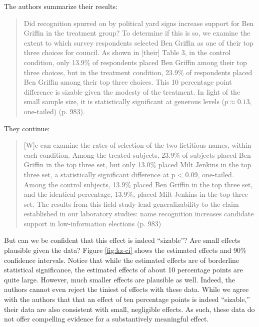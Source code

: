 \documentclass[12pt]{article}
\begin{document}
The authors summarize their results:

\begin{quote}
Did recognition spurred on by political yard signs increase support for Ben Griffin in the treatment group? To determine if this is so, we examine the extent to which survey respondents selected Ben Griffin as one of their top three choices for council. As shown in [their] Table 3, in the control condition, only 13.9\% of respondents placed Ben Griffin among their top three choices, but in the treatment condition, 23.9\% of respondents placed Ben Griffin among their top three choices. This 10 percentage point difference is sizable given the modesty of the treatment. In light of the small sample size, it is statistically significant at generous levels ($p \approx 0.13$, one-tailed) (p. 983).
\end{quote}

\noindent They continue:

\begin{quote}
[W]e can examine the rates of selection of the two fictitious names, within each condition. Among the treated subjects, 23.9\% of subjects placed Ben Griffin in the top three set, but only 13.0\% placed Milt Jenkins in the top three set, a statistically significant difference at p < 0.09, one-tailed. Among the control subjects, 13.9\% placed Ben Griffin in the top three set, and the identical percentage, 13.9\%, placed Milt Jenkins in the top three set. The results from this field study lend generalizability to the claim established in our laboratory studies: name recognition increases candidate support in low-information elections (p. 983)
\end{quote}

But can we be confident that this effect is indeed ``sizable''? Are small effects plausible given the data? Figure \ref{fig:kz-ci} shows the estimated effects and 90\% confidence intervals. Notice that while the estimated effects are of borderline statistical significance, the estimated effects of about 10 percentage points are quite large. However, much smaller effects are plausible as well. Indeed, the authors cannot even reject the tiniest of effects with these data. While we agree with the authors that that an effect of ten percentage points is indeed ``sizable,'' their data are also consistent with small, negligible effects. As such, these data do not offer compelling evidence for a substantively meaningful effect.
\end{document}
